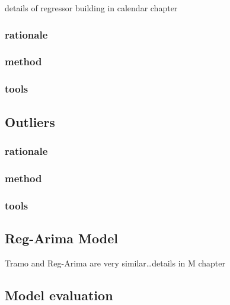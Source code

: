 \documentclass[
  letterpaper,
  DIV=11,
  numbers=noendperiod]{scrreprt}
\begin{document}
details of regressor building in calendar chapter

\hypertarget{rationale}{%
\subsubsection{rationale}\label{rationale}}

\hypertarget{method}{%
\subsubsection{method}\label{method}}

\hypertarget{tools-1}{%
\subsubsection{tools}\label{tools-1}}

\hypertarget{outliers}{%
\subsection{Outliers}\label{outliers}}

\hypertarget{rationale-1}{%
\subsubsection{rationale}\label{rationale-1}}

\hypertarget{method-1}{%
\subsubsection{method}\label{method-1}}

\hypertarget{tools-2}{%
\subsubsection{tools}\label{tools-2}}

\hypertarget{reg-arima-model}{%
\subsection{Reg-Arima Model}\label{reg-arima-model}}

Tramo and Reg-Arima are very similar\ldots details in M chapter

\hypertarget{model-evaluation}{%
\subsection{Model evaluation}\label{model-evaluation}}
\end{document}
